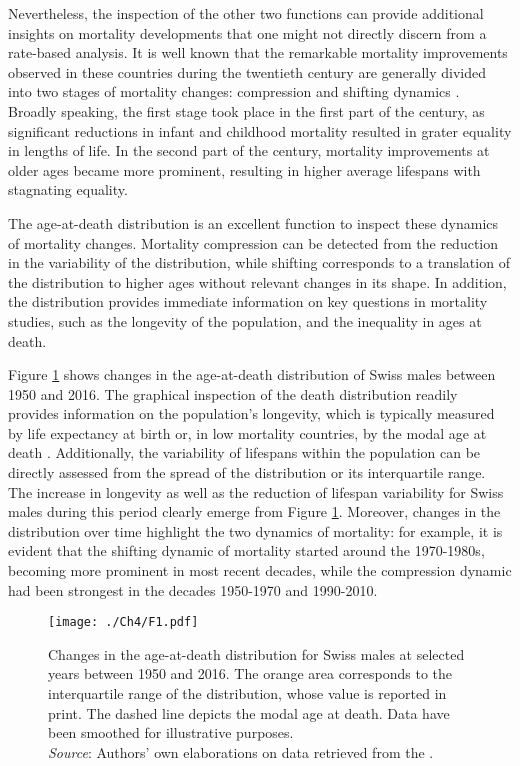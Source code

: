 \documentclass[Thesis]{subfiles}
\begin{document}
Nevertheless, the inspection of the other two functions can provide additional insights on mortality developments that one might not directly discern from a rate-based analysis. It is well known that the remarkable mortality improvements observed in these countries during the twentieth century are generally divided into two stages of mortality changes: compression and shifting dynamics \cite[see, for example,][]{fries1980aging,wilmoth1999rectangularization,kannisto2000measuring,bongaarts2005long,canudas2008modal}. Broadly speaking, the first stage took place in the first part of the century, as significant reductions in infant and childhood mortality resulted in grater equality in lengths of life. In the second part of the century, mortality improvements at older ages became more prominent, resulting in higher average lifespans with stagnating equality. 

The age-at-death distribution is an excellent function to inspect these dynamics of mortality changes. Mortality compression can be detected from the reduction in the variability of the distribution, while shifting corresponds to a translation of the distribution to higher ages without relevant changes in its shape. In addition, the distribution provides immediate information on key questions in mortality studies, such as the longevity of the population, and the inequality in ages at death.

Figure \ref{Fig:Ch4Intro} shows changes in the age-at-death distribution of Swiss males between 1950 and 2016. The graphical inspection of the death distribution readily provides information on the population's longevity, which is typically measured by life expectancy at birth or, in low mortality countries, by the modal age at death \citep{kannisto2001mode,horiuchi2013modal}. Additionally, the variability of lifespans within the population can be directly assessed from the spread of the distribution or its interquartile range. The increase in longevity as well as the reduction of lifespan variability for Swiss males during this period clearly emerge from Figure \ref{Fig:Ch4Intro}. Moreover, changes in the distribution over time highlight the two dynamics of mortality: for example, it is evident that the shifting dynamic of mortality started around the 1970-1980s, becoming more prominent in most recent decades, while the compression dynamic had been strongest in the decades 1950-1970 and 1990-2010.

\begin{figure}[!ht]
	\begin{center}
		\texttt{[image: ./Ch4/F1.pdf]}
		\caption{Changes in the age-at-death distribution for Swiss males at selected years between 1950 and 2016. The orange area corresponds to the interquartile range of the distribution, whose value is reported in print. The dashed line depicts the modal age at death. Data have been smoothed for illustrative purposes.\\\footnotesize{\textit{Source}: Authors' own elaborations on data retrieved from the \cite{HMD}.} \label{Fig:Ch4Intro}}		
	\end{center}
\end{figure}
\end{document}
